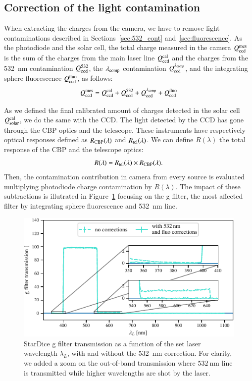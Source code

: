 \subsection{Correction of the light contamination}\label{sec:sd_contaminations}

When extracting the charges from the \SD camera, we have to remove light contaminations described in Sections~\ref{sec:532_cont} and~\ref{sec:fluorescence}. As the photodiode and the solar cell, the total charge measured in the \SD camera $Q_{\mathrm{ccd}}^{\mathrm{mes}}$ is the sum of the charges from the main laser line $Q_{\mathrm{ccd}}^{\mathrm{cal}}$ and the charges from the \SI{532}{\nm} contamination $Q_{\mathrm{ccd}}^{532}$, the $\lambda_{\rm comp}$ contamination $Q_{\mathrm{ccd}}^{\lambda_{\rm comp}}$, and the integrating sphere fluorescence $Q_{\mathrm{ccd}}^{\mathrm{fluo}}$, as follows:
\begin{equation}
    Q_{\mathrm{ccd}}^{\mathrm{mes}} = Q_{\mathrm{ccd}}^{\mathrm{cal}} + Q_{\mathrm{ccd}}^{532} + Q_{\mathrm{ccd}}^{\lambda_{\rm comp}} + Q_{\mathrm{ccd}}^{\mathrm{fluo}}
    \label{eq:qccd_mes}
\end{equation}

As we defined the final calibrated amount of charges detected in the solar cell $Q_{\mathrm{solar}}^{\mathrm{cal}}$, we do the same with the \SD CCD. The light detected by the \SD CCD has gone through the CBP optics and the \SD telescope. These instruments have respectively optical responses defined as $R_{\mathrm{CBP}}(\lambda)$ and $R_{\mathrm{tel}}(\lambda)$. We can define $R(\lambda)$ the total response of the CBP and the \SD telescope optics:
\begin{equation}
    R(\lambda) = R_{\mathrm{tel}}(\lambda) \times R_{\mathrm{CBP}}(\lambda).
    \label{eq:rtot}
\end{equation}
Then, the contamination contribution in \SD camera from every source is evaluated multiplying photodiode charge contamination by $R(\lambda)$.
The impact of these subtractions is illutrated in Figure~\ref{fig:g_filter_532} focusing on the \SD g filter, the most affected filter by integrating sphere fluorescence and \SI{532}{\nano\meter} line.

\begin{figure}[h]
    \centering
    \includegraphics[width=\columnwidth]{fig/g_filter_532.pdf}
    \caption{StarDice g filter transmission as a function of the set laser wavelength $\lambda_L$, with and without the \SI{532}{\nm} correction. For clarity, we added a zoom on the out-of-band transmission where $\SI{532}{\nm}$ line is transmitted while higher wavelengths are shot by the laser.}
    \label{fig:g_filter_532}
\end{figure}

